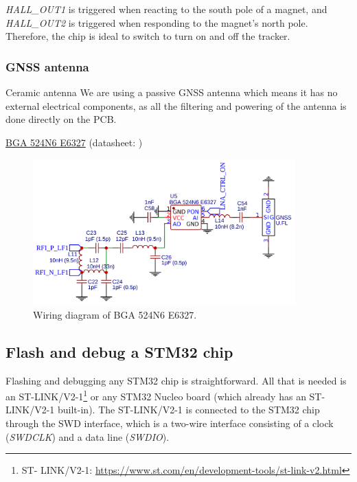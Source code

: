 \textit{HALL\_OUT1} is triggered when reacting to the south pole of a magnet, and \textit{HALL\_OUT2} is triggered when responding to the magnet's north pole. Therefore, the chip is ideal to switch to turn on and off the tracker.

\subsubsection{GNSS antenna}
Ceramic antenna
We are using a passive \ac{GNSS} antenna which means it has no external electrical components, as all the filtering and powering of the antenna is done directly on the \ac{PCB}.

\hyperref[bom:bga524n6e6327]{BGA 524N6 E6327} (datasheet: )

\begin{figure}[H]
    \centering
    \includegraphics[width=0.9\textwidth]{figures/BGA524N6E6327.png}
    \caption{Wiring diagram of BGA 524N6 E6327.}
    \label{fig:schematic:bga524n6e6327}
\end{figure}

\subsection{Flash and debug a STM32 chip} \label{sec:flash_debug_stm32}
Flashing and debugging any STM32 chip is straightforward. All that is needed is an ST-LINK/V2-1\footnote{ST-
LINK/V2-1: \url{https://www.st.com/en/development-tools/st-link-v2.html}} or any STM32 Nucleo board (which already has an ST-LINK/V2-1 built-in). The ST-LINK/V2-1 is connected to the STM32 chip through the \ac{SWD} interface, which is a two-wire interface consisting of a clock (\textit{SWDCLK}) and a data line (\textit{SWDIO}). 

